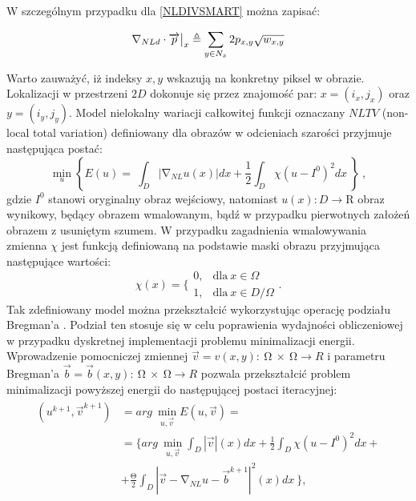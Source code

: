 \documentclass[12pt, twoside, openany]{report}
\theoremstyle{definition}
\begin{document}
W szczególnym przypadku dla \eqref{NLDIVSMART} można zapisać:
\begin{large}
\begin{equation}
{\mathrm{\nabla }}_{NLd}\cdot \overrightarrow{p}\big|_x \triangleq \sum_{ 
y\in N_x \\ 
}{2p_{x,y}}\sqrt{w_{x,y}}
\label{DNLDIVSMART}
\end{equation}
\end{large}
Warto zauważyć, iż indeksy $x,y$ wskazują na konkretny piksel w obrazie. Lokalizacji w przestrzeni $2D$ dokonuje się przez znajomość par: $x=(i_x,j_x)$ oraz $y=(i_y,j_y)$.
Model nielokalny wariacji całkowitej funkcji oznaczany $NLTV$ (non-local total variation) definiowany dla obrazów w odcieniach szarości przyjmuje następująca postać:
\begin{equation}
{\mathop{\mathrm{min}}_{u} \left\{E\left(u\right)=\ \int_D{\left|{\mathrm{\nabla }}_{NL}u(x)\right|}dx+\frac{1}{2}\int_D{\chi{\left(u-I^0\right)}^2}dx\ \right\}\ }
\label{NLTVGRAY}
,
\end{equation}
gdzie $I^0$ stanowi oryginalny obraz wejściowy, natomiast $u\left(x\right):D\mathrm{\longrightarrow }\mathrm{R}$ obraz wynikowy, będący obrazem wmalowanym, bądź w przypadku pierwotnych założeń obrazem z usuniętym szumem. W przypadku zagadnienia wmalowywania zmienna ${\chi }$ jest funkcją definiowaną na podstawie maski obrazu przyjmująca następujące wartości:
\begin{equation}
\chi \left(x\right)=\Bigg\{ \begin{array}{ll}
0, & \text{dla} \ x \in \Omega \\ 
1, & \text{dla} \ x \in D/ \Omega \end{array}
\label{maskFunction}
.
\end{equation}
Tak zdefiniowany model można przekształcić wykorzystując operację podziału Bregman’a \cite{bresson2009short}. Podział ten stosuje się w celu poprawienia wydajności obliczeniowej w przypadku dyskretnej implementacji problemu minimalizacji energii. Wprowadzenie pomocniczej zmiennej $\overrightarrow{v}=v\left(x,y\right):\ \mathrm{\Omega }\mathrm{\ } \times \ \mathrm{\Omega }\longrightarrow R$ i parametru Bregman’a $\overrightarrow{b}=\overrightarrow{b}\left(x,y\right):\ \mathrm{\Omega }\mathrm{\ }\times \ \mathrm{\Omega }\longrightarrow R$ pozwala przekształcić problem minimalizacji powyższej energii do następującej postaci iteracyjnej:
\begin{align}
\begin{aligned}
\left(u^{k+1},{\overrightarrow{v}}^{k+1}\right) &= arg\ \mathop{\mathrm{min}}_{u,\overrightarrow{v}} E\left(u,\overrightarrow{v}\right)=\\ 
&= \biggl\{arg\ \mathop{\mathrm{min}}_{u,\overrightarrow{v}}
\int_D{|\overrightarrow{v}|\left(x\right)}dx+\frac{1}{2}\int_D{{\chi }{\left(u-I^0\right)}^2}dx+\\
&+  \frac{\mathrm{\Theta }}{2}\int_D{{\left|\overrightarrow{v}-{\mathrm{\nabla }}_{NL}u-{\overrightarrow{b}}^{k+1}\right|}^2(x)}dx\ \biggr\},
\end{aligned}
\label{NLTVGRAYMINPROB}
\end{align}
\end{document}
